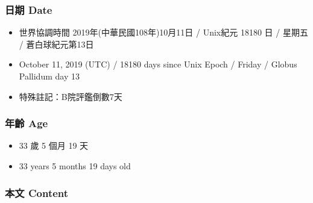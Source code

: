 \documentclass[a5paper, 12pt
]{book}
\providecommand{\tightlist}{%
  \setlength{\itemsep}{0pt}\setlength{\parskip}{0pt}}
\begin{document}
\hypertarget{ux65e5ux671f-date-10}{%
\subsubsection{日期 Date}\label{ux65e5ux671f-date-10}}

\begin{itemize}
\tightlist
\item
  世界協調時間 2019年(中華民國108年)10月11日 / Unix紀元 18180 日 /
  星期五 / 蒼白球紀元第13日
\item
  October 11, 2019 (UTC) / 18180 days since Unix Epoch / Friday / Globus
  Pallidum day 13
\item
  特殊註記：B院評鑑倒數7天
\end{itemize}

\hypertarget{ux5e74ux9f61-age-10}{%
\subsubsection{年齡 Age}\label{ux5e74ux9f61-age-10}}

\begin{itemize}
\tightlist
\item
  33 歲 5 個月 19 天
\item
  33 years 5 months 19 days old
\end{itemize}

\hypertarget{ux672cux6587-content-10}{%
\subsubsection{本文 Content}\label{ux672cux6587-content-10}}
\end{document}
